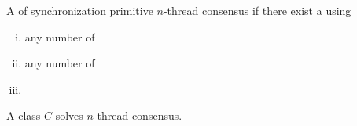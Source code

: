 % 
% 

\begin{frame}{}
  \begin{definition}[``Solves''] 
    A  of synchronization primitive  $n$-thread consensus 
    if there exist a  using 

    \begin{enumerate}[(i)]
      \item any number of 
      \item any number of 
	\pause
      \item {}
    \end{enumerate}
  \end{definition}
\end{frame}

\begin{frame}{}

  \centerline{\Large A class $C$ solves $n$-thread consensus.}
\end{frame}
